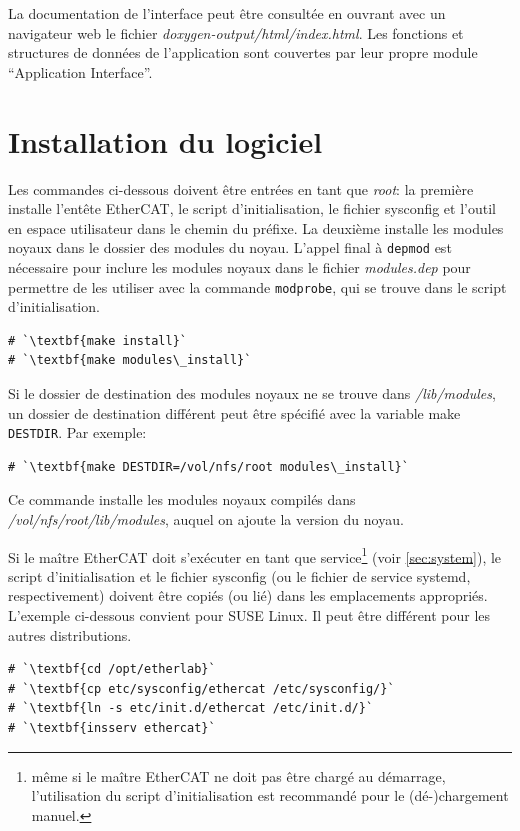 \documentclass[a4paper,12pt,BCOR=6mm,bibtotoc,idxtotoc]{scrbook}
\begin{document}
La documentation de l'interface peut \^etre consult\'ee en ouvrant avec
un navigateur web le fichier \textit{doxygen-output/html/index.html}.
Les fonctions et structures de donn\'ees de l'application sont couvertes
par leur propre module ``Application Interface''.

\section{Installation du logiciel}

Les commandes ci-dessous doivent \^etre entr\'ees en tant que
\textit{root}: la premi\`ere installe l'ent\^ete EtherCAT, le script
d'initialisation, le fichier sysconfig et l'outil en espace
utilisateur dans le chemin du pr\'efixe.  La deuxi\`eme installe les
modules noyaux dans le dossier des modules du noyau.  L'appel final
\`a \lstinline+depmod+ est n\'ecessaire pour inclure les modules
noyaux dans le fichier \textit{modules.dep} pour permettre de les
utiliser avec la commande \lstinline+modprobe+, qui se trouve dans le
script d'initialisation.

\begin{lstlisting}
# `\textbf{make install}`
# `\textbf{make modules\_install}`
\end{lstlisting}

Si le dossier de destination des modules noyaux ne se trouve dans
\textit{/lib/modules}, un dossier de destination diff\'erent peut \^etre
sp\'ecifi\'e avec la variable make \lstinline+DESTDIR+. Par exemple:

\begin{lstlisting}
# `\textbf{make DESTDIR=/vol/nfs/root modules\_install}`
\end{lstlisting}

Ce commande installe les modules noyaux compil\'es dans
\textit{/vol/nfs/root/lib/modules}, auquel on ajoute la version du
noyau.

Si le ma\^itre EtherCAT doit s'ex\'ecuter en tant que
service\footnote{ m\^eme si le ma\^itre EtherCAT ne doit pas \^etre
  charg\'e au d\'emarrage, l'utilisation du script d'initialisation
  est recommand\'e pour le (d\'e-)chargement manuel.} (voir
\autoref{sec:system}), le script d'initialisation et le fichier
sysconfig (ou le fichier de service systemd, respectivement) doivent
\^etre copi\'es (ou li\'e) dans les emplacements appropri\'es.
L'exemple ci-dessous convient pour SUSE Linux.  Il peut \^etre
diff\'erent pour les autres distributions.

\begin{lstlisting}
# `\textbf{cd /opt/etherlab}`
# `\textbf{cp etc/sysconfig/ethercat /etc/sysconfig/}`
# `\textbf{ln -s etc/init.d/ethercat /etc/init.d/}`
# `\textbf{insserv ethercat}`
\end{lstlisting}
\end{document}
